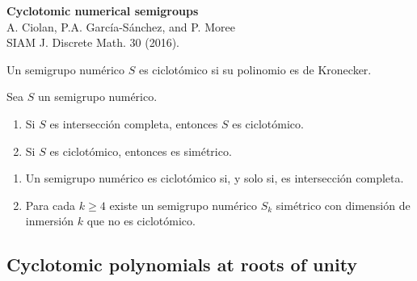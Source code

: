 \documentclass[10pt,compress]{beamer}
\begin{document}
\begin{frame}
  \begin{tcolorbox}[colback=ChetwodeBlue!10,colframe=ChetwodeBlue!60]
    \begin{center}
      \vspace*{-1mm}
      {\color{TurkishRose}\textbf{Cyclotomic numerical semigroups}} \\
      A. Ciolan, P.A. García-Sánchez, and P. Moree \\
      SIAM J. Discrete Math. 30 (2016).
    \end{center}
    \vspace*{-6mm}
  \end{tcolorbox}

  \begin{definition}
    Un semigrupo numérico $S$ es ciclotómico si su polinomio es de Kronecker.
  \end{definition}

  \begin{theorem} 
    Sea $S$ un semigrupo numérico.
    \begin{enumerate}
    \item Si $S$ es intersección completa, entonces $S$ es ciclotómico.
    \item Si $S$ es ciclotómico, entonces es simétrico.
    \end{enumerate}
  \end{theorem}

  \begin{conjecture}
    \vspace*{-1mm}
    \begin{enumerate}
    \item Un semigrupo numérico es ciclotómico si, y solo si, es intersección completa.
    \item Para cada $k \ge 4$ existe un semigrupo numérico $S_k$ simétrico con dimensión de inmersión $k$ que no es ciclotómico.
    \end{enumerate}
    \vspace*{-1mm}
  \end{conjecture}
\end{frame}

\subsection{Cyclotomic polynomials at roots of unity}
\end{document}
